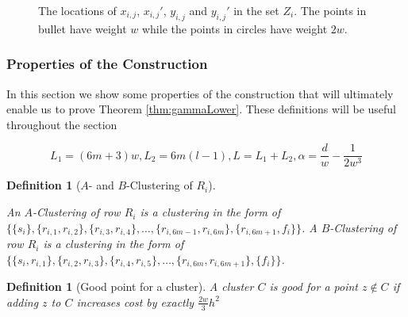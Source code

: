 \documentclass{article}
\newtheorem{definition}[theorem]{Definition}
\begin{document}
  \begin{figure}[!tbp]
  \centering
  \begin{minipage}[b]{0.49\textwidth}
    \resizebox{\linewidth}{!}{}
    \caption{Geometry of $H_{l,m}$. This figure is similar to Fig. 1 in \cite{vattani2009hardness}. The left hand side shows the complete design. Rows $R_i$ have $6m+1$ bullets and two circles. Rows $G_i$ have $3m$ circles. The bullets have weight $w$ while the circles have weight $2w$. The distance between the rows $R_i$ and $G_i$ is $> 2(h+\sqrt{h^2-1})$.}
    \label{fig:lowerBoundComponent}
  \end{minipage}
  \hfill
  \begin{minipage}[b]{0.49\textwidth}
    
    \caption{The locations of $x_{i,j}$, $x_{i,j}'$, $y_{i,j}$ and $y_{i,j}'$ in the set $Z_i$. The points in bullet have weight $w$ while the points in circles have weight $2w$.}
    \label{fig:ZFig}
  \end{minipage}
\end{figure}
  




\subsubsection{Properties of the Construction}

In this section we show some properties of the construction that will ultimately enable us to prove Theorem \ref{thm:gammaLower}. These definitions will be useful throughout the section

$$L_1 = (6m+3)w, L_2 = 6m(l-1), L=L_1 + L_2, \alpha = \frac{d}{w}-\frac{1}{2w^3}$$

\begin{definition}[$A$- and $B$-Clustering of $R_i$]
\label{defn:abclusteringVattani}

An $A$-Clustering of row $R_i$ is a clustering in the form of $\{\{s_i\}, \{r_{i,1}, r_{i,2}\}, \{r_{i,3}, r_{i,4}\}, \ldots, \{r_{i,6m-1}, r_{i,6m}\},\{r_{i, 6m+1}, f_i\}\}$. A $B$-Clustering of row $R_i$ is a clustering in the form of $\{\{s_i, r_{i, 1}\}, \{r_{i,2}, r_{i,3}\}, \{r_{i,4}, r_{i,5}\}, \ldots, \{r_{i,6m}, r_{i,6m+1}\},\{f_i\}\}$. 
\end{definition}

\begin{definition}[Good point for a cluster]
\label{defn:goodPointVattani}
A cluster $C$ is good for a point $z \not\in C$ if adding $z$ to $C$ increases cost by exactly $\frac{2w}{3}h^2$ 
\end{definition}
\end{document}
